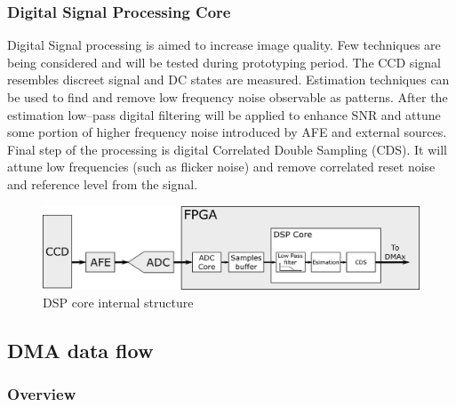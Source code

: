 \subsubsection{Digital Signal Processing Core}
\label{sec:dsp}

Digital Signal processing is aimed to increase image quality. Few techniques are being considered and will be tested during prototyping period. The CCD signal resembles discreet signal and DC states are measured. Estimation techniques can be used to find and remove low frequency noise observable as patterns. After the estimation low--pass digital filtering will be applied to enhance SNR and attune some portion of higher frequency noise introduced by AFE and external sources. Final step of the processing is digital Correlated Double Sampling (CDS). It will attune low frequencies (such as flicker noise) and remove correlated reset noise and reference level from the signal. 

\begin{figure}[H]
\centering
\includegraphics[width=\textwidth]{pict/dspcore.png}
\caption{DSP core internal structure }
\label{fig:dspcore}
\end{figure}


\subsection{DMA data flow}

\subsubsection{Overview}

